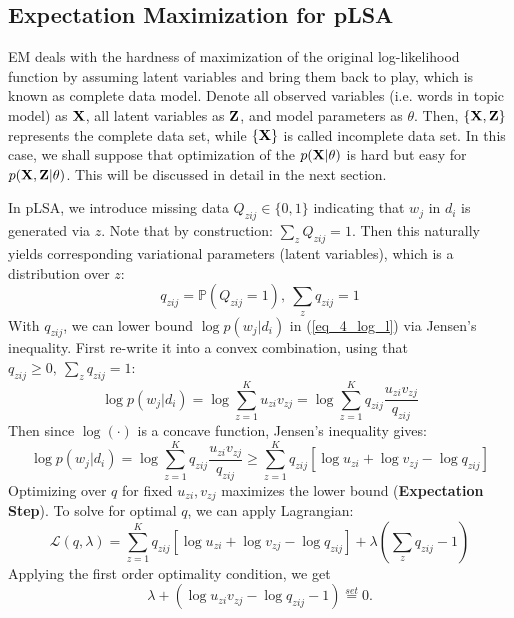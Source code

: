 \documentclass[../main.tex]{subfiles}
\begin{document}
\subsection{Expectation Maximization for pLSA}
EM deals with the hardness of maximization of the original log-likelihood function by assuming latent variables and bring them back to play, which is known as complete data model. Denote all observed variables (i.e. words in topic model) as ${\bf X}$, all latent variables as ${\bf Z}$, and model parameters as $\theta$. Then, $\{{\bf X, Z}\}$ represents the complete data set, while $\{{\bf X}\}$ is called incomplete data set. In this case, we shall suppose that optimization of the $p({\bf X}|\theta)$ is hard but easy for $p({\bf X, Z}|\theta)$. This will be discussed in detail in the next section.
\par In pLSA, we introduce missing data $Q_{zij}\in\{0,1\}$ indicating that $w_j$ in $d_i$ is generated via $z$. Note that by construction: $\sum_{z}Q_{zij}=1$. Then this naturally yields corresponding variational parameters (latent variables), which is a distribution over $z$:
\begin{equation*}
q_{zij}=\mathbb{P}(Q_{zij}=1),\ \sum_{z} q_{zij}=1
\end{equation*}
With $q_{zij}$, we can lower bound $\log p(w_j|d_i)$ in (\ref{eq_4_log_l}) via Jensen's inequality. First re-write it into a convex combination, using that $q_{zij}\geq 0,\ \sum_{z} q_{zij}=1$:
\begin{equation*}
\log p(w_j|d_i) = \log \sum_{z=1}^{K} u_{zi}v_{zj} =  \log \sum_{z=1}^{K} q_{zij}\frac{u_{zi}v_{zj}}{q_{zij}}
\end{equation*}
Then since $\log(\cdot)$ is a concave function, Jensen's inequality gives:
\begin{equation}\label{eq_4_lwb}
\log p(w_j|d_i) =\log \sum_{z=1}^{K} q_{zij}\frac{u_{zi}v_{zj}}{q_{zij}} \geq \sum_{z=1}^{K} q_{zij}[\log u_{zi} + \log v_{zj} - \log q_{zij}]
\end{equation}
Optimizing over $q$ for fixed $u_{zi},v_{zj}$ maximizes the lower bound (\textbf{Expectation Step}). To solve for optimal $q$, we can apply Lagrangian:
\begin{equation*}
\mathcal{L}(q, \lambda) = \sum_{z=1}^{K} q_{zij}[\log u_{zi} + \log v_{zj} - \log q_{zij}] + \lambda (\sum_{z} q_{zij}-1)
\end{equation*}
Applying the first order optimality condition, we get
\begin{equation*}
\lambda + (\log u_{zi}v_{zj} - \log q_{zij} -1) \overset{set}{=}0.
\end{equation*}
\end{document}
